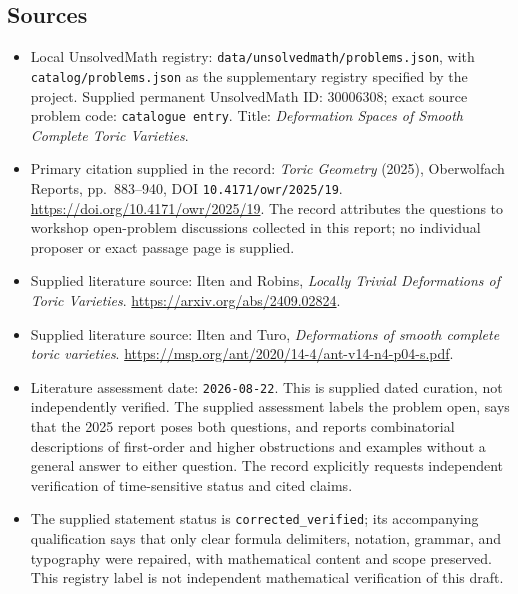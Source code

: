 \documentclass[11pt]{article}
\begin{document}
\subsection{Sources}
\begin{itemize}
\item Local UnsolvedMath registry: \texttt{data/unsolvedmath/problems.json}, with \texttt{catalog/problems.json} as the supplementary registry specified by the project. Supplied permanent UnsolvedMath ID: \(30006308\); exact source problem code: \texttt{catalogue entry}. Title: \emph{Deformation Spaces of Smooth Complete Toric Varieties}.
\item Primary citation supplied in the record: \emph{Toric Geometry} (2025), Oberwolfach Reports, pp.~883--940, DOI \texttt{10.4171/owr/2025/19}. \url{https://doi.org/10.4171/owr/2025/19}. The record attributes the questions to workshop open-problem discussions collected in this report; no individual proposer or exact passage page is supplied.
\item Supplied literature source: Ilten and Robins, \emph{Locally Trivial Deformations of Toric Varieties}. \url{https://arxiv.org/abs/2409.02824}.
\item Supplied literature source: Ilten and Turo, \emph{Deformations of smooth complete toric varieties}. \url{https://msp.org/ant/2020/14-4/ant-v14-n4-p04-s.pdf}.
\item Literature assessment date: \texttt{2026-08-22}. This is supplied dated curation, not independently verified. The supplied assessment labels the problem open, says that the 2025 report poses both questions, and reports combinatorial descriptions of first-order and higher obstructions and examples without a general answer to either question. The record explicitly requests independent verification of time-sensitive status and cited claims.
\item The supplied statement status is \texttt{corrected\_verified}; its accompanying qualification says that only clear formula delimiters, notation, grammar, and typography were repaired, with mathematical content and scope preserved. This registry label is not independent mathematical verification of this draft.
\end{itemize}
\end{document}
